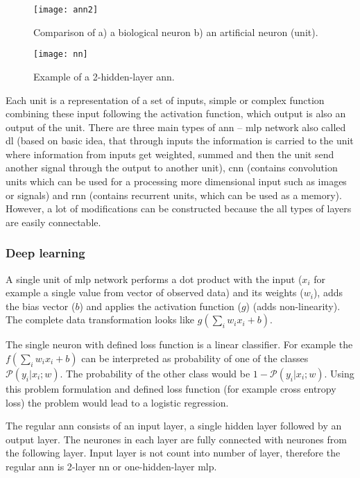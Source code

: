 \documentclass[thesis=M,english]{FITthesis}[2012/10/20]
\begin{document}
\begin{figure}[ht]\centering
    \texttt{[image: ann2]}
    \caption{Comparison of a) a biological neuron b) an artificial neuron (unit).}\label{fig:ann}
\end{figure}

\begin{figure}[ht]\centering
    \texttt{[image: nn]}
    \caption{Example of a 2-hidden-layer \gls{ann}.}\label{fig:ann_structure}
\end{figure}

Each unit is a representation of a set of inputs, simple or complex function combining these input following the activation function, which output is also an output of the unit. There are three main types of \gls{ann} -- \gls{mlp} network also called \gls{dl} (based on basic idea, that through inputs the information is carried to the unit where information from inputs get weighted, summed and then the unit send another signal through the output to another unit), \gls{cnn} (contains convolution units which can be used for a processing more dimensional input such as images or signals) and \gls{rnn} (contains recurrent units, which can be used as a memory). However, a lot of modifications can be constructed because the all types of layers are easily connectable. 

\subsubsection{Deep learning}\label{sec:ann}

A single unit of \gls{mlp} network performs a dot product with the input ($x_i$ for example a single value from vector of observed data) and its weights ($w_i$), adds the bias vector ($b$) and applies the activation function ($g$) (adds non-linearity). The complete data transformation looks like $g(\sum_{i}{w_i x_i + b})$. 

The single neuron with defined loss function is a linear classifier.\cite{Johnson2017ann_intro} For example the $f(\sum_{i}{w_i x_i + b})$ can be interpreted as probability of one of the classes $\mathcal{P}(y_i|x_i;w)$. The probability of the other class would be $1-\mathcal{P}(y_i|x_i;w)$. Using this problem formulation and defined loss function (for example cross entropy loss) the problem would lead to a logistic regression.\cite{Johnson2017ann_intro}

The regular \gls{ann} consists of an input layer, a single hidden layer followed by an output layer. The neurones in each layer are fully connected with neurones from the following layer. Input layer is not count into number of layer, therefore the regular \gls{ann} is 2-layer \gls{nn}\cite{Johnson2017ann_intro} or one-hidden-layer \gls{mlp}\cite{theano_mlp}.  
\end{document}
